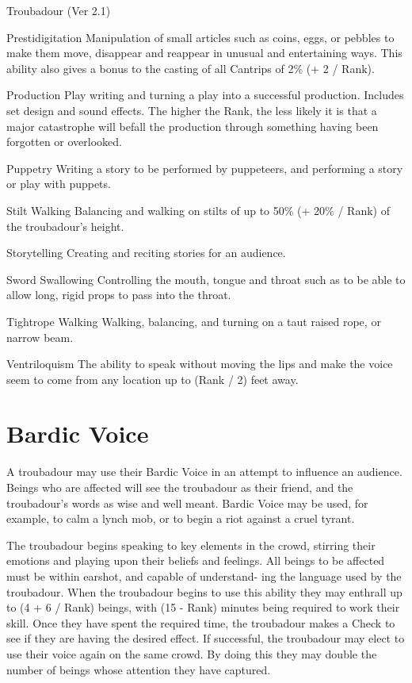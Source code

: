 \begin{Chapter}{Troubadour (Ver 2.1)}
\begin{Description}
\item[Prestidigitation] Manipulation of small articles such as coins,
  eggs, or pebbles to make them move, disappear and reappear in
  unusual and entertaining ways. This ability also gives a bonus to
  the casting of all Cantrips of 2\% (+ 2 / Rank).

\item[Production] Play writing and turning a play into a successful
  production.  Includes set design and sound effects. The higher the
  Rank, the less likely it is that a major catastrophe will befall the
  production through something having been forgotten or overlooked.

\item[Puppetry] Writing a story to be performed by puppeteers, and
  performing a story or play with puppets.

\item[Stilt Walking] Balancing and walking on stilts of up to 50\% (+
  20\% / Rank) of the troubadour’s height.

\item[Storytelling] Creating and reciting stories for an audience.

\item[Sword Swallowing] Controlling the mouth, tongue and throat such
  as to be able to allow long, rigid props to pass into the throat.

\item[Tightrope] Walking Walking, balancing, and turning on a taut
  raised rope, or narrow beam.

\item[Ventriloquism] The ability to speak without moving the lips and
  make the voice seem to come from any location up to (Rank / 2) feet
  away.

\end{Description}

\section{Bardic Voice}

A troubadour may use their Bardic Voice in an attempt to influence an
audience.  Beings who are affected will see the troubadour as their
friend, and the troubadour’s words as wise and well meant.  Bardic
Voice may be used, for example, to calm a lynch mob, or to begin a
riot against a cruel tyrant.

The troubadour begins speaking to key elements in the crowd, stirring
their emotions and playing upon their beliefs and feelings. All beings
to be affected must be within earshot, and capable of understand- ing
the language used by the troubadour. When the troubadour begins to use
this ability they may enthrall up to (4 + 6 / Rank) beings, with (15 -
Rank) minutes being required to work their skill.  Once they have
spent the required time, the troubadour makes a Check to see if they
are having the desired effect.  If successful, the troubadour may
elect to use their voice again on the same crowd.  By doing this they
may double the number of beings whose attention they have captured.


\end{Chapter}
